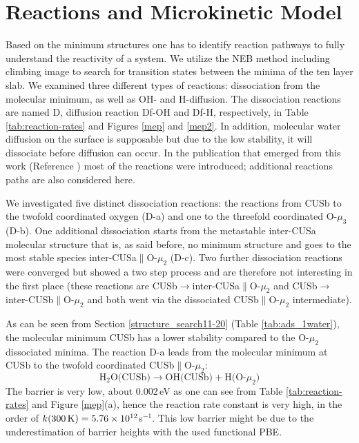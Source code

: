 \documentclass[11pt,DIV=13,BCOR=5mm,a4paper,headinclude]{scrbook}
\begin{document}
\section{Reactions and Microkinetic Model}\label{reactions}

Based on the minimum structures one has to identify reaction pathways to fully understand the reactivity of a system.
We utilize the NEB method including climbing image to search for transition states between the minima of the ten layer slab.
We examined three different types of reactions: dissociation from the molecular minimum, as well as OH- and H-diffusion.
The dissociation reactions are named D, diffusion reaction Df-OH and Df-H, respectively, in Table \ref{tab:reaction-rates} and Figures \ref{mep} and \ref{mep2}.
In addition, molecular water diffusion on the surface is supposable but due to the low stability, it will dissociate before diffusion can occur.
In the publication that emerged from this work (Reference \cite{Heiden11-20_2018}) most of the reactions were introduced; additional reactions paths are also considered here.


We investigated five distinct dissociation reactions: the reactions from CUSb to the twofold coordinated oxygen (D-a) and one to the threefold coordinated O-$\mu_3$ (D-b).
One additional dissociation starts from the metastable inter-CUSa molecular structure that is, as said before, no minimum structure and goes to the most stable species inter-CUSa$\parallel$O-$\mu_2$ (D-c).
Two further dissociation reactions were converged but showed a two step process and are therefore not interesting in the first place (these reactions are CUSb$\rightarrow$inter-CUSa$\parallel$O-$\mu_2$ and CUSb$\rightarrow$inter-CUSb$\parallel$O-$\mu_2$ and both went via the dissociated CUSb$\parallel$O-$\mu_2$ intermediate).


As can be seen from Section \ref{structure_search11-20} (Table \ref{tab:ads_1water}), the molecular minimum CUSb has a lower stability compared to the O-$\mu_2$ dissociated minima.
The reaction D-a leads from the molecular minimum at CUSb to the twofold coordinated CUSb$\parallel$O-$\mu_2$:
 \begin{equation}
 \text{H$_2$O(CUSb)} \rightarrow \text{OH(CUSb)} + \text{H(O-$\mu_2$)} \tag{D-a}
      \label{dissa}
\end{equation}
The barrier is very low, about $0.002\,$eV as one can see from Table \ref{tab:reaction-rates} and Figure \ref{mep}(a), hence the reaction rate constant is very high, in the order of $k(\textrm{300\,K})=5.76\times 10^{12}$s$^{-1}$.
This low barrier might be due to the underestimation of barrier heights\cite{Zhao05} with the used functional PBE. %
\end{document}
